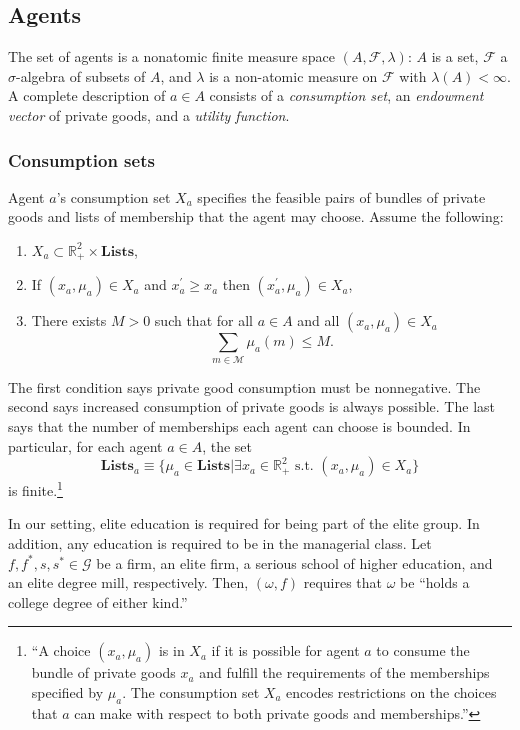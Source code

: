 \documentclass[12pt,letterpaper]{article}
\begin{document}
	\subsection{Agents}
	The set of agents is a nonatomic finite measure space $(A,\mathcal{F},\lambda)$: $A$ is a set, $\mathcal{F}$ a $\sigma$-algebra of subsets of $A$, and $\lambda$ is a non-atomic measure on $\mathcal{F}$ with $\lambda(A)<\infty$.
	A complete description of $a\in A$ consists of a \textit{consumption set}, an \textit{endowment vector} of private goods, and a \textit{utility function}. 
	
	\subsubsection{Consumption sets}
	Agent $a$'s consumption set $X_a$ specifies the feasible pairs of bundles of private goods and lists of membership that the agent may choose.
	Assume the following:
	\begin{enumerate}
		\item $X_a\subset\mathbb{R}^2_+\times\textbf{Lists}$,
		\item If $(x_a,\mu_a)\in X_a$ and $x^\prime_a\ge x_a$ then $(x^\prime_a,\mu_a)\in X_a$,
		\item There exists $M>0$ such that for all $a\in A$ and all $(x_a,\mu_a)\in X_a$
		\[
		\sum_{m\in\mathcal{M}}\mu_a(m)\le M.
		\]
	\end{enumerate}
	The first condition says private good consumption must be nonnegative. 
	The second says increased consumption of private goods is always possible.
	The last says that the number of memberships each agent can choose is bounded.
	In particular, for each agent $a\in A$, the set
	\[
	\textbf{Lists}_a\equiv\{\mu_a\in\textbf{Lists}|\exists x_a\in \mathbb{R}^2_+ \text{ s.t. }(x_a,\mu_a)\in X_a\}
	\]
	is finite.\footnote
	{
		``A choice $(x_a,\mu_a)$ is in $X_a$ if it is possible for agent $a$ to consume the bundle of private goods $x_a$ and fulfill the requirements of the memberships specified by $\mu_a$.
		The consumption set $X_a$ encodes restrictions on the choices that $a$ can make with respect to both private goods and memberships.''
	}
	
	In our setting, elite education is required for being part of the elite group.
	In addition, any education is required to be in the managerial class.
	Let $f,f^\ast,s,s^\ast\in\mathcal{G}$ be a firm,  an elite firm, a serious school of higher education, and an elite degree mill, respectively.
	Then, $(\omega,f)$ requires that $\omega$ be ``holds a college degree of either kind.''
	
\end{document}
